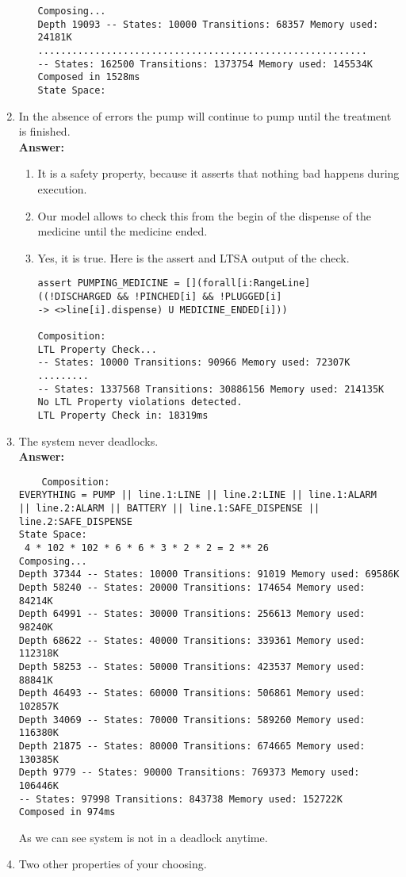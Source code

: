 \documentclass{article}
\begin{document}
\begin{enumerate}
\begin{enumerate}
\begin{verbatim}
Composing...
Depth 19093 -- States: 10000 Transitions: 68357 Memory used: 24181K
..........................................................
-- States: 162500 Transitions: 1373754 Memory used: 145534K
Composed in 1528ms
State Space:
\end{verbatim}
	\end{enumerate}
    \item In the absence of errors the pump will continue to pump until the
treatment is finished.\\
    \textbf{Answer:} 
    \begin{enumerate}
    	\item It is a safety property, because it asserts that nothing bad happens during execution.
    	\item Our model allows to check this from the begin of the dispense of the medicine until the medicine ended.
    	\item Yes, it is true. Here is the assert and LTSA output of the check.
\begin{verbatim}
assert PUMPING_MEDICINE = [](forall[i:RangeLine] 
((!DISCHARGED && !PINCHED[i] && !PLUGGED[i] 
-> <>line[i].dispense) U MEDICINE_ENDED[i]))

Composition:
LTL Property Check...
-- States: 10000 Transitions: 90966 Memory used: 72307K
.........
-- States: 1337568 Transitions: 30886156 Memory used: 214135K
No LTL Property violations detected.
LTL Property Check in: 18319ms
\end{verbatim}
	\end{enumerate}
    \item The system never deadlocks.\\
    \textbf{Answer:}
    \begin{verbatim}
    Composition:
EVERYTHING = PUMP || line.1:LINE || line.2:LINE || line.1:ALARM 
|| line.2:ALARM || BATTERY || line.1:SAFE_DISPENSE || line.2:SAFE_DISPENSE
State Space:
 4 * 102 * 102 * 6 * 6 * 3 * 2 * 2 = 2 ** 26
Composing...
Depth 37344 -- States: 10000 Transitions: 91019 Memory used: 69586K
Depth 58240 -- States: 20000 Transitions: 174654 Memory used: 84214K
Depth 64991 -- States: 30000 Transitions: 256613 Memory used: 98240K
Depth 68622 -- States: 40000 Transitions: 339361 Memory used: 112318K
Depth 58253 -- States: 50000 Transitions: 423537 Memory used: 88841K
Depth 46493 -- States: 60000 Transitions: 506861 Memory used: 102857K
Depth 34069 -- States: 70000 Transitions: 589260 Memory used: 116380K
Depth 21875 -- States: 80000 Transitions: 674665 Memory used: 130385K
Depth 9779 -- States: 90000 Transitions: 769373 Memory used: 106446K
-- States: 97998 Transitions: 843738 Memory used: 152722K
Composed in 974ms
    \end{verbatim}
    As we can see system is not in a deadlock anytime.
    \item Two other properties of your choosing.
\end{enumerate}
\end{document}
